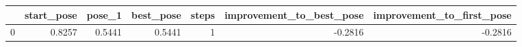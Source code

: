 \begin{tabular}{lrrrrrr}
\toprule
{} &  start\_pose &  pose\_1 &  best\_pose &  steps &  improvement\_to\_best\_pose &  improvement\_to\_first\_pose \\
\midrule
0 &      0.8257 &  0.5441 &     0.5441 &      1 &                   -0.2816 &                    -0.2816 \\
\bottomrule
\end{tabular}
